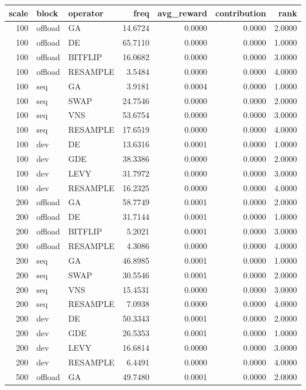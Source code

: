 \begin{tabular}{rllrrrr}
\toprule
scale & block & operator & freq & avg_reward & contribution & rank \\
\midrule
100 & offload & GA & 14.6724 & 0.0000 & 0.0000 & 2.0000 \\
100 & offload & DE & 65.7110 & 0.0000 & 0.0000 & 1.0000 \\
100 & offload & BITFLIP & 16.0682 & 0.0000 & 0.0000 & 3.0000 \\
100 & offload & RESAMPLE & 3.5484 & 0.0000 & 0.0000 & 4.0000 \\
100 & seq & GA & 3.9181 & 0.0004 & 0.0000 & 1.0000 \\
100 & seq & SWAP & 24.7546 & 0.0000 & 0.0000 & 2.0000 \\
100 & seq & VNS & 53.6754 & 0.0000 & 0.0000 & 3.0000 \\
100 & seq & RESAMPLE & 17.6519 & 0.0000 & 0.0000 & 4.0000 \\
100 & dev & DE & 13.6316 & 0.0001 & 0.0000 & 1.0000 \\
100 & dev & GDE & 38.3386 & 0.0000 & 0.0000 & 2.0000 \\
100 & dev & LEVY & 31.7972 & 0.0000 & 0.0000 & 3.0000 \\
100 & dev & RESAMPLE & 16.2325 & 0.0000 & 0.0000 & 4.0000 \\
200 & offload & GA & 58.7749 & 0.0001 & 0.0000 & 2.0000 \\
200 & offload & DE & 31.7144 & 0.0001 & 0.0000 & 1.0000 \\
200 & offload & BITFLIP & 5.2021 & 0.0001 & 0.0000 & 3.0000 \\
200 & offload & RESAMPLE & 4.3086 & 0.0000 & 0.0000 & 4.0000 \\
200 & seq & GA & 46.8985 & 0.0001 & 0.0000 & 1.0000 \\
200 & seq & SWAP & 30.5546 & 0.0001 & 0.0000 & 2.0000 \\
200 & seq & VNS & 15.4531 & 0.0000 & 0.0000 & 3.0000 \\
200 & seq & RESAMPLE & 7.0938 & 0.0000 & 0.0000 & 4.0000 \\
200 & dev & DE & 50.3343 & 0.0001 & 0.0000 & 2.0000 \\
200 & dev & GDE & 26.5353 & 0.0001 & 0.0000 & 1.0000 \\
200 & dev & LEVY & 16.6814 & 0.0000 & 0.0000 & 3.0000 \\
200 & dev & RESAMPLE & 6.4491 & 0.0000 & 0.0000 & 4.0000 \\
500 & offload & GA & 49.7480 & 0.0001 & 0.0000 & 2.0000 \\

\end{tabular}
